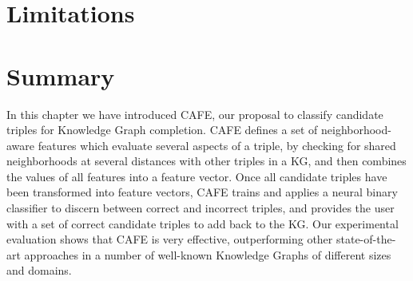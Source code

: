 \section{Limitations}\label{sec:cafe-limitations}



\section{Summary}\label{sec:cafe-summary}
In this chapter we have introduced CAFE, our proposal to classify candidate triples for Knowledge Graph completion. CAFE defines a set of neighborhood-aware features which evaluate several aspects of a triple, by checking for shared neighborhoods at several distances with other triples in a KG, and then combines the values of all features into a feature vector. Once all candidate triples have been transformed into feature vectors, CAFE trains and applies a neural binary classifier to discern between correct and incorrect triples, and provides the user with a set of correct candidate triples to add back to the KG. Our experimental evaluation shows that CAFE is very effective, outperforming other state-of-the-art approaches in a number of well-known Knowledge Graphs of different sizes and domains.
